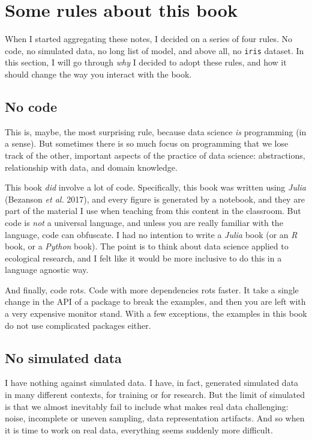\documentclass[
  letterpaper,
]{scrbook}
\begin{document}
\section{Some rules about this book}\label{some-rules-about-this-book}

When I started aggregating these notes, I decided on a series of four
rules. No code, no simulated data, no long list of model, and above all,
no \texttt{iris} dataset. In this section, I will go through \emph{why}
I decided to adopt these rules, and how it should change the way you
interact with the book.

\subsection{No code}\label{no-code}

This is, maybe, the most surprising rule, because data science \emph{is}
programming (in a sense). But sometimes there is so much focus on
programming that we lose track of the other, important aspects of the
practice of data science: abstractions, relationship with data, and
domain knowledge.

This book \emph{did} involve a lot of code. Specifically, this book was
written using \emph{Julia} (Bezanson \emph{et al.} 2017), and every
figure is generated by a notebook, and they are part of the material I
use when teaching from this content in the classroom. But code is
\emph{not} a universal language, and unless you are really familiar with
the language, code can obfuscate. I had no intention to write a
\emph{Julia} book (or an \emph{R} book, or a \emph{Python} book). The
point is to think about data science applied to ecological research, and
I felt like it would be more inclusive to do this in a language agnostic
way.

And finally, code rots. Code with more dependencies rots faster. It take
a single change in the API of a package to break the examples, and then
you are left with a very expensive monitor stand. With a few exceptions,
the examples in this book do not use complicated packages either.

\subsection{No simulated data}\label{no-simulated-data}

I have nothing against simulated data. I have, in fact, generated
simulated data in many different contexts, for training or for research.
But the limit of simulated is that we almost inevitably fail to include
what makes real data challenging: noise, incomplete or uneven sampling,
data representation artifacts. And so when it is time to work on real
data, everything seems suddenly more difficult.
\end{document}
